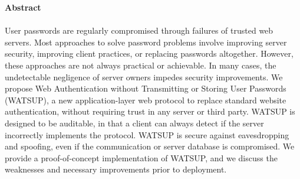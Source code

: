 %

\noindent \large{\textbf{Abstract}}\\
\\
\noindent User passwords are regularly compromised through failures of trusted web servers. Most approaches to solve password problems involve improving server security, improving client practices, or replacing passwords altogether. However, these approaches are not always practical or achievable. In many cases, the undetectable negligence of server owners impedes security improvements. We propose Web Authentication without Transmitting or Storing User Passwords (WATSUP), a new application-layer web protocol to replace standard website authentication, without requiring trust in any server or third party. WATSUP is designed to be auditable, in that a client can always detect if the server incorrectly implements the protocol. WATSUP is secure against eavesdropping and spoofing, even if the communication or server database is compromised. We provide a proof-of-concept implementation of WATSUP, and we discuss the weaknesses and necessary improvements prior to deployment.
